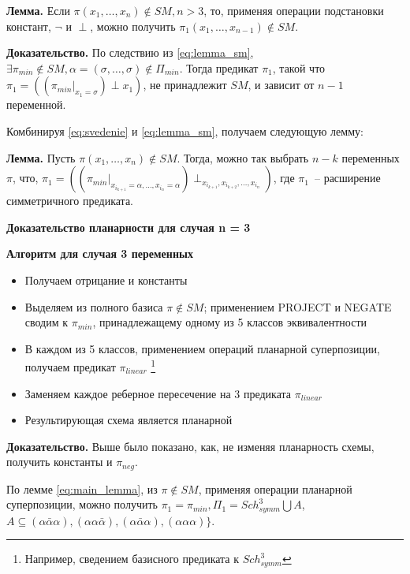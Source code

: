 \documentclass[12pt]{article}
\begin{document}
\label{eq:svedenie}
\textbf{Лемма.} Если $\pi(x_1, \dots, x_n) \notin SM, n > 3$, то, применяя операции подстановки констант, $\neg$ и $\perp$,
можно получить $\pi_1(x_1, \dots, x_{n-1}) \notin SM$.

\textbf{Доказательство.} По следствию из \ref{eq:lemma_sm}, 
$\exists \pi_{min} \notin SM, \alpha=(\sigma, \dots, \sigma) \notin \Pi_{min}$. Тогда предикат $\pi_1$, такой что
$\pi_1 = ( (\pi_{min}|_{x_1=\sigma}) \perp x_1 )$, не принадлежит $SM$, и зависит от $n-1$ переменной.


Комбинируя \ref{eq:svedenie} и \ref{eq:lemma_sm}, получаем следующую лемму:

\label{eq:main_lemma}
\textbf{Лемма.} Пусть $\pi(x_1, \dots, x_n) \notin SM$. Тогда, можно так выбрать $n-k$ переменных $\pi$, что,
$\pi_1 = ((\pi_{min} |_{x_{i_{k+1}}=\alpha, \dots, x_{i_n}=\alpha}) \perp_{x_{i_{k+1}}, x_{i_{k+2}}, \dots, x_{i_n}})$,
где $\pi_1$~-- расширение симметричного предиката.

\textbf{Доказательство планарности для случая n = 3}

\textbf{Алгоритм для случая 3 переменных}
\begin{itemize}
\item{Получаем отрицание и константы}
\item{Выделяем из полного базиса $\pi \notin SM$; применением PROJECT и NEGATE сводим к $\pi_{min}$,
 принадлежащему одному из 5 классов эквивалентности}
\item{В каждом из 5 классов, применением операций планарной суперпозиции, получаем предикат $\pi_{linear}$
\footnote{Например, сведением базисного предиката к $Sch_{symm}^3$}}
\item{Заменяем каждое реберное пересечение на 3 предиката $\pi_{linear}$}
\item{Результирующая схема является планарной}
\end{itemize}

\textbf{Доказательство.}
Выше было показано, как, не изменяя планарность схемы, получить константы и $\pi_{neg}$. 

По лемме \ref{eq:main_lemma}, из $\pi \notin SM$, применяя операции планарной суперпозиции, можно получить 
$\pi_1 = \pi_{min}, \Pi_1 = Sch_{symm}^3 \bigcup A$,
$ A \subseteq(\alpha \bar{\alpha} \alpha), (\alpha \alpha \bar{\alpha}), (\alpha \bar{\alpha} \alpha), (\alpha \alpha \alpha) \} $.
\end{document}
